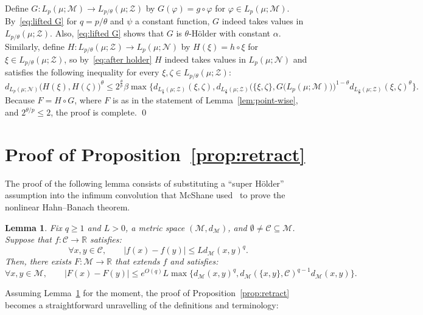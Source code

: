 \documentclass[11pt,reqno]{amsart}
\newtheorem{lemma}[theorem]{Lemma}
\newcommand{\R}{\mathbb{R}}
\renewcommand{\le}{\leqslant}
\renewcommand{\ge}{\geqslant}
\renewcommand{\subset}{\subseteq}
\newcommand{\cZ}{\mathcal{Z}}
\newcommand{\NN}{\mathcal{N}}
\newcommand{\MM}{\mathcal{M}}
\newcommand{\sub}{\mathscr{C}}
\newcommand{\f}{\varphi}
\begin{document}
Define $G: L_p(\mu;\MM)\to L_{p/\theta}(\mu;\cZ)$ by  $G(\f)=g\circ \f$ for  $\f\in L_p(\mu;\MM)$.  By~\eqref{eq:lifted G} for $q=p/\theta$ and $\psi$ a constant function,  $G$ indeed takes values in $L_{p/\theta}(\mu;\cZ)$. Also, \eqref{eq:lifted G}  shows that $G$ is $\theta$-H\"older with constant $\alpha$. Similarly, define $H:L_{p/\theta}(\mu;\cZ)\to L_p(\mu;\NN)$ by $H(\xi)=h\circ \xi$ for $\xi\in L_{p/\theta}(\mu;\cZ)$, so by~\eqref{eq:after holder}  $H$ indeed takes values in   $L_p(\mu;\NN)$ and satisfies the following  inequality for every $\xi,\zeta\in L_{p/\theta}(\mu;\cZ)$:
$$
d_{L_{p}(\mu;\NN)}\big(H(\xi),H(\zeta)\big)^\theta\le 
2^{\frac{\theta}{p}} \beta\max \bigg\{d_{L_{\frac{p}{\theta}}(\mu;\cZ)}(\xi,\zeta),d_{L_{\frac{p}{\theta}}(\mu;\cZ)}\Big(\{\xi,\zeta\},G\big( L_{p}(\mu;\MM)\big)\Big)^{1-\theta}d_{L_{\frac{p}{\theta}}(\mu;\cZ)}(\xi,\zeta)^\theta\bigg\}.
$$
Because $F=H\circ G$, where $F$ is as in the statement of Lemma~\ref{lem:point-wise}, and $2^{\theta/p}\le 2$, the proof is complete.  \qed




\section{Proof of Proposition~\ref{prop:retract}}\label{sec:retract}

The proof of the following lemma consists of substituting a ``super H\"older'' assumption into the infimum convolution that McShane used~\cite{McS34} to prove the nonlinear Hahn--Banach theorem. 


\begin{lemma}\label{lem:mcshane variant} Fix $q\ge 1$ and $L>0$, a metric space $(\MM,d_\MM)$, and $\emptyset\neq \sub\subset \MM$. Suppose that $f:\sub\to \R$ satisfies: 
\begin{equation}\label{eq:q holder}
\forall x,y\in \sub,\qquad |f(x)-f(y)|\le Ld_\MM(x,y)^q. 
\end{equation}
Then, there exists $F:\MM\to \R$ that extends $f$ and satisfies:
\begin{equation}\label{eq:mcshane conclusion}
\forall x,y\in \MM,\qquad |F(x)-F(y)|\le e^{O(q)}L \max\big\{d_\MM(x,y)^{q},d_\MM(\{x,y\},\sub)^{q-1}d_\MM(x,y)\big\}.
\end{equation} 
\end{lemma}


Assuming Lemma~\ref{lem:mcshane variant} for the moment, the proof of Proposition~\ref{prop:retract} becomes a straightforward unravelling of the definitions and terminology:
\end{document}

